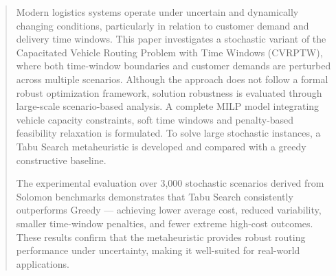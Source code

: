 %
\markboth{}{}
%
%








\maketitle
\thispagestyle{fancy}%
%


 
\begin{abstract}
Modern logistics systems operate under uncertain and dynamically changing conditions, particularly in relation to customer demand and delivery time windows. This paper investigates a stochastic variant of the Capacitated Vehicle Routing Problem with Time Windows (CVRPTW), where both time-window boundaries and customer demands are perturbed across multiple scenarios. Although the approach does not follow a formal robust optimization framework, solution robustness is evaluated through large-scale scenario-based analysis. A complete MILP model integrating vehicle capacity constraints, soft time windows and penalty-based feasibility relaxation is formulated. To solve large stochastic instances, a Tabu Search metaheuristic is developed and compared with a greedy constructive baseline.

The experimental evaluation over 3,000 stochastic scenarios derived from Solomon benchmarks demonstrates that Tabu Search consistently outperforms Greedy — achieving lower average cost, reduced variability, smaller time-window penalties, and fewer extreme high-cost outcomes. These results confirm that the metaheuristic provides robust routing performance under uncertainty, making it well-suited for real-world applications.

\end{abstract}


